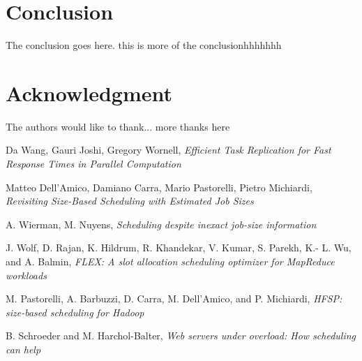 \documentclass[10pt, conference, compsocconf]{IEEEtran}
\begin{document}
\section{Conclusion}
The conclusion goes here. this is more of the conclusionhhhhhhh



\section*{Acknowledgment}


The authors would like to thank...
more thanks here




%
%
%
   \begin{thebibliography}{1}


Da Wang, Gauri Joshi, Gregory Wornell, \emph{ Efficient Task Replication for Fast Response Times in Parallel Computation}



Matteo Dell’Amico, Damiano Carra, Mario Pastorelli, Pietro Michiardi, \emph{ Revisiting Size-Based Scheduling
with Estimated Job Sizes}

A. Wierman, M. Nuyens, \emph{ Scheduling despite inexact job-size
information}

J. Wolf, D. Rajan, K. Hildrum, R. Khandekar, V. Kumar, S. Parekh, K.-
L. Wu, and A. Balmin, \emph{FLEX: A slot allocation scheduling optimizer
for MapReduce workloads}

M. Pastorelli, A. Barbuzzi, D. Carra, M. Dell’Amico, and P. Michiardi, \emph{HFSP: size-based scheduling for Hadoop}

B. Schroeder and M. Harchol-Balter, \emph{Web servers under overload: How
scheduling can help}

\end{thebibliography}

\end{document}
